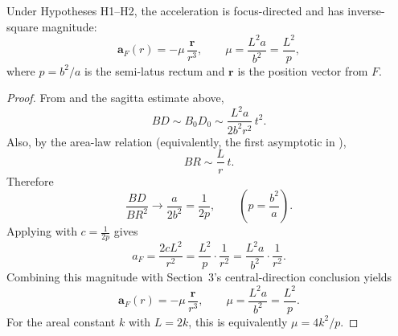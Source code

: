 \begin{proposition}
\label{prop:proof1-ellipse-inverse-square}
Under Hypotheses H1--H2, the acceleration is focus-directed and has inverse-square magnitude:
\begin{equation}
  \mathbf a_F(r) = -\mu\,\frac{\mathbf r}{r^3},
  \qquad
  \mu=\frac{L^2 a}{b^2}=\frac{L^2}{p},
\end{equation}
where $p=b^2/a$ is the semi-latus rectum and $\mathbf r$ is the position vector from $F$.
\end{proposition}
\begin{proof}
From  and the sagitta estimate above,
\[
  BD\sim B_0D_0\sim \frac{L^2 a}{2 b^2 r^2}\,t^2.
\]
Also, by the area-law relation (equivalently, the first asymptotic in ),
\[
  BR\sim \frac{L}{r}\,t.
\]
Therefore
\[
  \frac{BD}{BR^2}\to \frac{a}{2b^2}=\frac{1}{2p},
  \qquad \left(p=\frac{b^2}{a}\right).
\]
Applying  with $c=\frac{1}{2p}$ gives
\[
  a_F=\frac{2cL^2}{r^2}
  =\frac{L^2}{p}\cdot\frac{1}{r^2}
  =\frac{L^2 a}{b^2}\cdot\frac{1}{r^2}.
\]
Combining this magnitude with Section~3's central-direction conclusion yields
\[
  \mathbf a_F(r) = -\mu\,\frac{\mathbf r}{r^3},
  \qquad
  \mu=\frac{L^2a}{b^2}=\frac{L^2}{p}.
\]
For the areal constant $k$ with $L=2k$, this is equivalently $\mu=4k^2/p$.
\end{proof}
